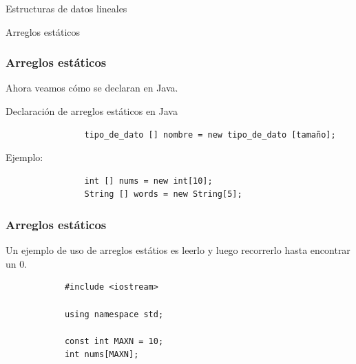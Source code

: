 \documentclass{beamer}
\begin{document}
\begin{section}{Estructuras de datos lineales}
\begin{subsection}{Arreglos estáticos}
	\begin{frame}[fragile]
		\frametitle{Arreglos estáticos}
		Ahora veamos cómo se declaran en Java.
		\begin{block}{Declaración de arreglos estáticos en Java}
			\begin{verbatim}
				tipo_de_dato [] nombre = new tipo_de_dato [tamaño];
			\end{verbatim}
			Ejemplo:
			\begin{verbatim}
				int [] nums = new int[10];
				String [] words = new String[5];
			\end{verbatim}	
		\end{block}
		\begin{figure}
		\end{figure}		
	\end{frame}
	
	\begin{frame}[fragile]
		\frametitle{Arreglos estáticos}
		\small{Un ejemplo de uso de arreglos estátios es leerlo y luego recorrerlo hasta encontrar un 0.}
		\begin{lstlisting}
			#include <iostream>
			
			using namespace std;

			const int MAXN = 10;
			int nums[MAXN];
			

\end{lstlisting}
\end{frame}
\end{subsection}
\end{section}
\end{document}
